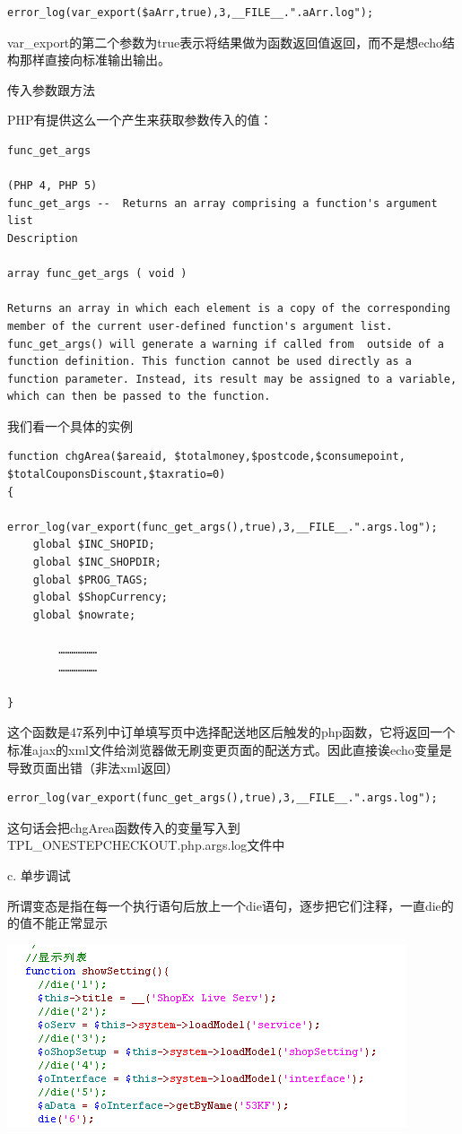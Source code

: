 \documentclass{article}
\begin{document}
\begin{verbatim}
error_log(var_export($aArr,true),3,__FILE__.".aArr.log");
\end{verbatim}
var\_export的第二个参数为true表示将结果做为函数返回值返回，而不是想echo结构那样直接向标准输出输出。

传入参数跟方法

PHP有提供这么一个产生来获取参数传入的值：

\begin{verbatim}
func_get_args

(PHP 4, PHP 5)
func_get_args --  Returns an array comprising a function's argument list
Description

array func_get_args ( void )

Returns an array in which each element is a copy of the corresponding member of the current user-defined function's argument list. func_get_args() will generate a warning if called from  outside of a function definition. This function cannot be used directly as a function parameter. Instead, its result may be assigned to a variable, which can then be passed to the function. 
\end{verbatim}

我们看一个具体的实例

\begin{verbatim}
function chgArea($areaid, $totalmoney,$postcode,$consumepoint, $totalCouponsDiscount,$taxratio=0)
{
    error_log(var_export(func_get_args(),true),3,__FILE__.".args.log"); 
    global $INC_SHOPID;
    global $INC_SHOPDIR;
    global $PROG_TAGS;
    global $ShopCurrency;
    global $nowrate;

        ………………
        ………………

}
\end{verbatim}
这个函数是47系列中订单填写页中选择配送地区后触发的php函数，它将返回一个标准ajax的xml文件给浏览器做无刷变更页面的配送方式。因此直接诶echo变量是导致页面出错（非法xml返回）

\begin{verbatim}
error_log(var_export(func_get_args(),true),3,__FILE__.".args.log"); 
\end{verbatim}
这句话会把chgArea函数传入的变量写入到TPL\_ONESTEPCHECKOUT.php.args.log文件中

c. 单步调试

所谓变态是指在每一个执行语句后放上一个die语句，逐步把它们注释，一直die的的值不能正常显示

\includegraphics{img/operation/debug/1.png}
\end{document}
